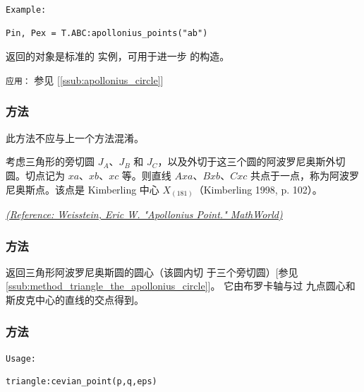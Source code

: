 \medskip

\texttt{Example: }
\begin{verbatim}
Pin, Pex = T.ABC:apollonius_points("ab")
\end{verbatim}

返回的对象是标准的  实例，可用于进一步
的构造。

\texttt{应用：} 参见 [\ref{ssub:apollonius_circle}]


\subsubsection{方法 }
\label{ssub:apollonius_point}

此方法不应与上一个方法混淆。

考虑三角形的旁切圆 $J_A$、$J_B$ 和 $J_C$，以及外切于这三个圆的阿波罗尼奥斯外切圆。切点记为 $xa$、$xb$、$xc$ 等。则直线 $Axa$、$Bxb$、$Cxc$ 共点于一点，称为阿波罗尼奥斯点。该点是 Kimberling 中心 $X_(181)$（Kimberling 1998, p. 102）。

\begin{flushright}
\small
\href{https://mathworld.wolfram.com/ApolloniusPoint.html}{\textit{(Reference: Weisstein, Eric W. "Apollonius Point." MathWorld)}}
\end{flushright}


\subsubsection{方法 }
\label{ssub:method_triangle_the_apollonius_center}

返回三角形阿波罗尼奥斯圆的圆心（该圆内切
于三个旁切圆）[参见 \ref{ssub:method_triangle_the_apollonius_circle}]。
它由布罗卡轴与过
九点圆心和斯皮克中心的直线的交点得到。

\begin{tkzexample}
\end{tkzexample}

\subsubsection{方法 }
\label{ssub:cevian_point}

\texttt{Usage: }

\begin{verbatim}
triangle:cevian_point(p,q,eps)
\end{verbatim}

